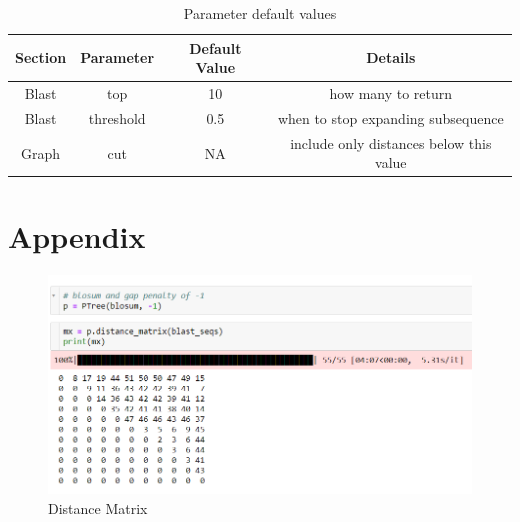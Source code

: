 \documentclass[11pt]{article}
\begin{document}

\begin{table}[h!]
\centering
\begin{tabular}{|c|c|c|c|}
\hline
\textbf{Section} & \textbf{Parameter} & \textbf{Default Value} & \textbf{Details}                        \\ \hline
Blast            & top                & 10                     & how many to return                      \\ \hline
Blast            & threshold          & 0.5                    & when to stop expanding subsequence      \\ \hline
Graph            & cut                & NA                     & include only distances below this value \\ \hline
\end{tabular}
\caption{Parameter default values\label{tab:parameters}}
\end{table}

\newpage

\section*{Appendix}
\appendix 

\begin{figure}[h!]
    \centering
    \includegraphics{matrix.png}
    \caption{Distance Matrix}
\end{figure}
\end{document}
